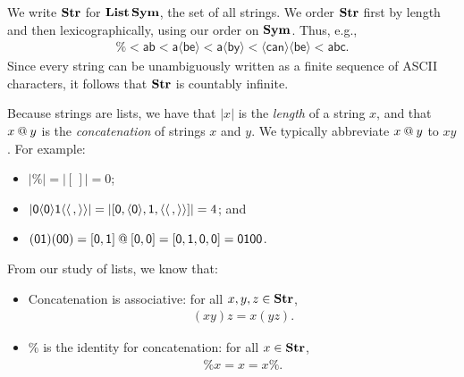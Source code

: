 We write $\mathbf{Str}$ for $\mathbf{List}\,\mathbf{Sym}$, the set of all strings.
%
%
We order
%
$\mathbf{Str}$ first by length and then lexicographically, using our order on
$\mathbf{Sym}$.  Thus, e.g.,
\begin{gather*}
\% < \mathsf{ab} < \mathsf{a\langle be\rangle} < \mathsf{a\langle by\rangle} <
\mathsf{\langle can\rangle\langle be\rangle} < \mathsf{abc} .
\end{gather*}
Since every string can be unambiguously written as a finite sequence of ASCII
characters, it follows that $\mathbf{Str}$ is countably infinite.
%

Because strings are lists, we have that $|x|$ is the \emph{length}
%
%
%
%
of a string $x$, and that $x\mathbin{@} y$ is the \emph{concatenation}
%
%
of strings $x$ and $y$.
We typically abbreviate $x\mathbin{@} y$ to $xy$.
For example:
\begin{itemize}
\item $|\%| = |[\,]| = 0$;

\item $|\mathsf{0\langle 0\rangle1\langle\langle\,,\rangle\rangle}| =
|[\mathsf{0},\langle\mathsf{0}\rangle,\mathsf{1}, \langle\langle\,,\rangle\rangle]| = 4$;
and

\item $(\mathsf{01})(\mathsf{00}) =
\mathsf{[0,1]}\mathbin{@}\mathsf{[0,0]} =
\mathsf{[0,1,0,0]} = \mathsf{0100}$.
\end{itemize}

From our study of lists, we know that:
\begin{itemize}
\item Concatenation is associative: for all $x,y,z\in\mathbf{Str}$,
%
%
%
\begin{gather*}
(xy)z = x(yz) .
\end{gather*}

\item $\%$ is the identity for concatenation: for all $x\in\mathbf{Str}$,
%
%
%
\begin{gather*}
\%x=x=x\% .
\end{gather*}
\end{itemize}

